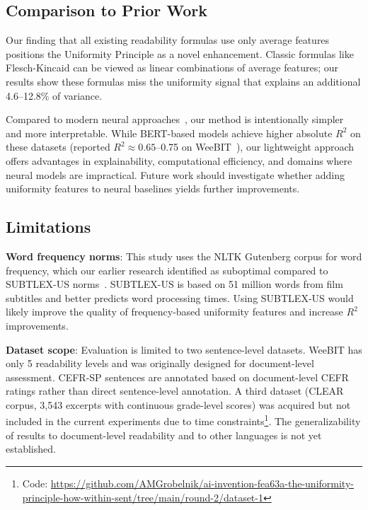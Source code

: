 \documentclass[11pt,letterpaper]{article}
\begin{document}
\subsection{Comparison to Prior Work}

Our finding that all existing readability formulas use only average features~\cite{Feng2010} positions the Uniformity Principle as a novel enhancement. Classic formulas like Flesch-Kincaid can be viewed as linear combinations of average features; our results show these formulas miss the uniformity signal that explains an additional 4.6--12.8\% of variance.

Compared to modern neural approaches~\cite{Deutsch2020, Liu2023}, our method is intentionally simpler and more interpretable. While BERT-based models achieve higher absolute $R^2$ on these datasets (reported $R^2 \approx 0.65$--0.75 on WeeBIT~\cite{Deutsch2020}), our lightweight approach offers advantages in explainability, computational efficiency, and domains where neural models are impractical. Future work should investigate whether adding uniformity features to neural baselines yields further improvements.

\subsection{Limitations}

\textbf{Word frequency norms}: This study uses the NLTK Gutenberg corpus for word frequency, which our earlier research identified as suboptimal compared to SUBTLEX-US norms~\cite{Brysbaert2009}. SUBTLEX-US is based on 51 million words from film subtitles and better predicts word processing times. Using SUBTLEX-US would likely improve the quality of frequency-based uniformity features and increase $R^2$ improvements.

\textbf{Dataset scope}: Evaluation is limited to two sentence-level datasets. WeeBIT has only 5 readability levels and was originally designed for document-level assessment. CEFR-SP sentences are annotated based on document-level CEFR ratings rather than direct sentence-level annotation. A third dataset (CLEAR corpus, 3,543 excerpts with continuous grade-level scores) was acquired but not included in the current experiments due to time constraints\footnote{Code: \url{https://github.com/AMGrobelnik/ai-invention-fea63a-the-uniformity-principle-how-within-sent/tree/main/round-2/dataset-1}}. The generalizability of results to document-level readability and to other languages is not yet established.
\end{document}

